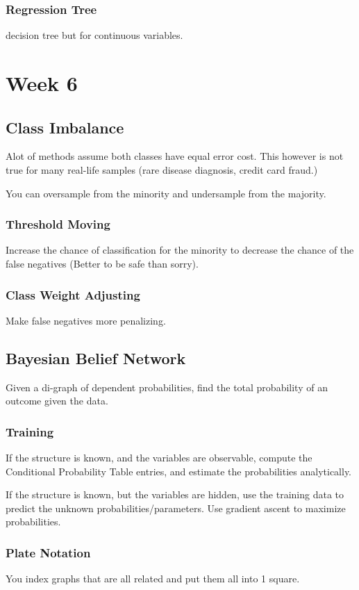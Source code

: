 \documentclass[fleqn]{report}
\begin{document}
\subsection{Regression Tree}
decision tree but for continuous variables.

\chapter{Week 6}
\section{Class Imbalance}
Alot of methods assume both classes have equal error cost. This 
however is not true for many real-life samples (rare disease diagnosis, credit 
card fraud.)

You can oversample from the minority and undersample from the majority.

\subsection{Threshold Moving}
Increase the chance of classification for the minority to decrease the 
chance of the false negatives (Better to be safe than sorry).


\subsection{Class Weight Adjusting}
Make false negatives more penalizing. 

\section{Bayesian Belief Network}
Given a di-graph of dependent probabilities, find the total probability of an 
outcome given the data. 

\subsection{Training}
If the structure is known, and the variables are observable, 
compute the Conditional Probability Table entries, and estimate the probabilities 
analytically. 

If the structure is known, but the variables are hidden, use the training 
data to predict the unknown probabilities/parameters. Use gradient 
ascent to maximize probabilities.

\subsection{Plate Notation}
You index graphs that are all related and put them all into 1 square.
\end{document}
